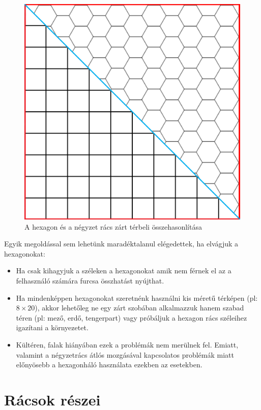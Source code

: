 \begin{figure}[h!]
\centering
\includegraphics[scale=0.1]{kepek/SqVsHex.png}
\caption{A hexagon és a négyzet rács zárt térbeli összehasonlítása}
\label{fig:SqVsHex}
\end{figure}

\noindent Egyik megoldással sem lehetünk maradéktalanul elégedettek, ha elvágjuk a hexagonokat: 

\begin{itemize}
\item Ha csak kihagyjuk a széleken a hexagonokat amik nem férnek el az a felhasználó számára furcsa összhatást nyújthat.
\item Ha mindenképpen hexagonokat  szeretnénk használni kis méretű térképen (pl: $8 \times 20$), akkor lehetőleg ne egy zárt szobában alkalmazzuk hanem szabad téren (pl: mező, erdő, tengerpart) vagy próbáljuk a hexagon rács széleihez igazítani a környezetet.
\item Kültéren, falak hiányában ezek a problémák nem merülnek fel. Emiatt, valamint a négyzetrács átlós mozgásával kapcsolatos problémák miatt előnyösebb a hexagonháló használata ezekben az esetekben.
\end{itemize}

\section{Rácsok részei}

